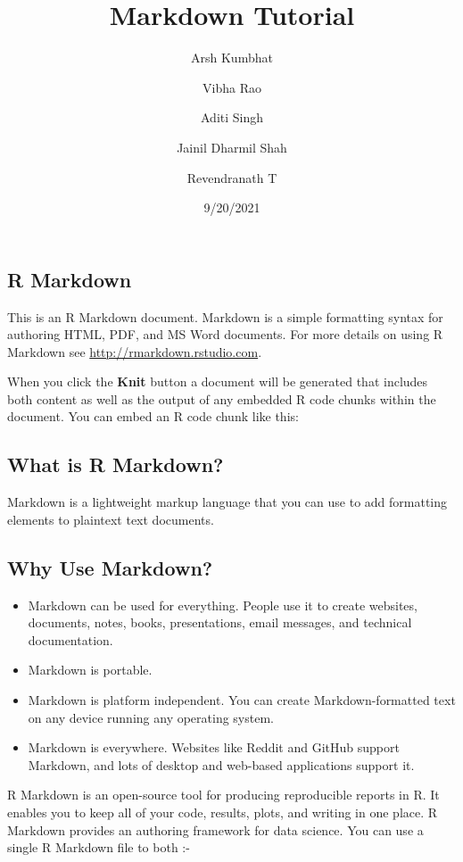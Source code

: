 \documentclass[
]{article}
\title{Markdown Tutorial}
\author{Arsh Kumbhat \and Vibha Rao \and Aditi Singh \and Jainil Dharmil
Shah \and Revendranath T}
\date{9/20/2021}
\providecommand{\tightlist}{%
  \setlength{\itemsep}{0pt}\setlength{\parskip}{0pt}}
\begin{document}
\maketitle

\hypertarget{r-markdown}{%
\subsection{R Markdown}\label{r-markdown}}

This is an R Markdown document. Markdown is a simple formatting syntax
for authoring HTML, PDF, and MS Word documents. For more details on
using R Markdown see \url{http://rmarkdown.rstudio.com}.

When you click the \textbf{Knit} button a document will be generated
that includes both content as well as the output of any embedded R code
chunks within the document. You can embed an R code chunk like this:

\hypertarget{what-is-r-markdown}{%
\subsection{What is R Markdown?}\label{what-is-r-markdown}}

Markdown is a lightweight markup language that you can use to add
formatting elements to plaintext text documents.

\hypertarget{why-use-markdown}{%
\subsection{Why Use Markdown?}\label{why-use-markdown}}

\begin{itemize}
\tightlist
\item
  Markdown can be used for everything. People use it to create websites,
  documents, notes, books, presentations, email messages, and technical
  documentation.
\item
  Markdown is portable.
\item
  Markdown is platform independent. You can create Markdown-formatted
  text on any device running any operating system.
\item
  Markdown is everywhere. Websites like Reddit and GitHub support
  Markdown, and lots of desktop and web-based applications support it.
\end{itemize}

R Markdown is an open-source tool for producing reproducible reports in
R. It enables you to keep all of your code, results, plots, and writing
in one place. R Markdown provides an authoring framework for data
science. You can use a single R Markdown file to both :-
\end{document}
